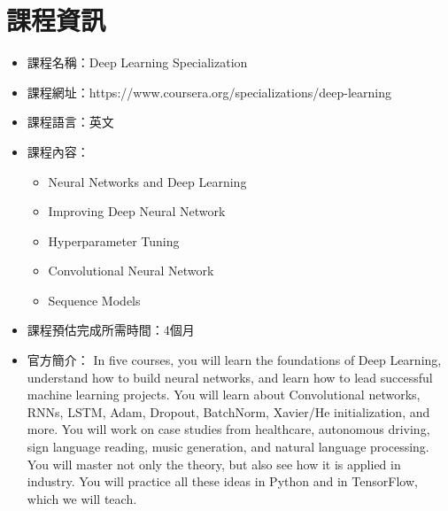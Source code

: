 \chapter*{課程資訊}

\begin{itemize}
    \item[] 課程名稱：Deep Learning Specialization 
    \item[] 課程網址：https://www.coursera.org/specializations/deep-learning  
    \item[] 課程語言：英文  
    \item[] 課程內容：
        \begin{itemize}
            \item Neural Networks and Deep Learning
            \item Improving Deep Neural Network
            \item Hyperparameter Tuning 
            \item Convolutional Neural Network
            \item Sequence Models
        \end{itemize}
    \item[] 課程預估完成所需時間：4個月
    \item[] 官方簡介： 
        In five courses, you will learn the foundations of Deep Learning, understand how to build neural networks, and learn how to lead successful machine learning projects. You will learn about Convolutional networks, RNNs, LSTM, Adam, Dropout, BatchNorm, Xavier/He initialization, and more. You will work on case studies from healthcare, autonomous driving, sign language reading, music generation, and natural language processing. You will master not only the theory, but also see how it is applied in industry. You will practice all these ideas in Python and in TensorFlow, which we will teach.
\end{itemize}